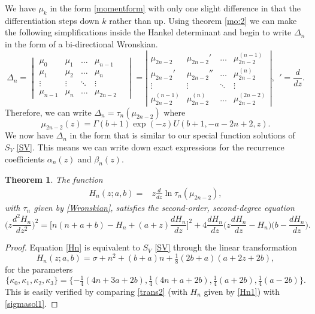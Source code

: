 \documentclass[12pt]{article}
\newtheorem{mydef}{Theorem}[section]
\numberwithin{figure}{section}
\numberwithin{equation}{section}
\numberwithin{table}{section}
\begin{document}
We have $\mu_k$ in the form \eqref{momentform} with only one slight difference in that the differentiation steps down $k$ rather than up. Using theorem \eqref{mo:2} we can make the following simplifications inside the Hankel
determinant and begin to write $\Delta_n$ in the form of a bi-directional Wronskian.
\[\Delta_n=
\begin{vmatrix}
\mu_{0} & \mu_1  &\hdots& \mu_{n-1} \\
\mu_1 & \mu_2  &\hdots& \mu_n  \\
\vdots &\vdots & \ddots &\vdots & \\
\mu_{n-1} & \mu_n &\hdots& \mu_{2n-2}
\end{vmatrix}
=\left|
\begin{array}{ccccc}
\mu_{2n-2} & \mu_{2n-2}' &\hdots& \mu_{2n-2}^{(n-1)} \\
\mu_{2n-2}' & \mu_{2n-2}''  &\hdots& \mu_{2n-2}^{(n)}  \\
\vdots &\vdots & \ddots &\vdots \\
\mu_{2n-2}^{(n-1)} & \mu_{2n-2}^{(n)} &\hdots& \mu_{2n-2}^{(2n-2)}
\end{array}
\right|,~~'=\frac{d}{dz}.\]
Therefore, we can write $\Delta_n=\tau_n(\mu_{2n-2})$
where
\begin{equation}\nonumber
\mu_{2n-2}(z)=\Gamma( b+1)\exp(-z)U( b+1,- a-2n+2,z).
\end{equation}
We now have $\Delta_n$ in the form that is similar to our special function solutions of $S_{V}$ \eqref{SV}. This means we can write down exact expressions for the recurrence coefficients $\alpha_n(z)$ and $\beta_n(z)$.
\begin{mydef} The function
\begin{align}
H_n(z; a, b)=&z\frac{d}{dz}\ln \tau_n(\mu_{2n-2}),\label{Hn1}
\end{align}
with $\tau_n$ given by \eqref{Wronskian}, satisfies the second-order, second-degree equation
\begin{equation}
\bigg(z\frac{d^2H_n}{dz^2}\bigg)^2=\bigg[n(n+ a+ b)-H_n+( a+z)\frac{dH_n}{dz}\bigg]^2+4\frac{dH_n}{dz}\bigg(z
\frac{dH_n}{dz}-H_n\bigg)\bigg( b-\frac{dH_n}{dz}\bigg).\label{Hn}
\end{equation}
\end{mydef}
\begin{proof}
Equation \eqref{Hn} is equivalent to $S_V$ \eqref{SV} through the linear transformation
\begin{equation}
H_{{n}}(z; a, b)  =\sigma + n^2+( b+ a)n+\tfrac{1}{8}(2 b+ a)( a+2z+2 b),\label{trans2}
\end{equation}
for the parameters
\begin{equation}
\{\kappa_0,\kappa_1,\kappa_2,\kappa_3\}=\{-\tfrac{1}{4}(4n+3 a+2 b),\tfrac{1}{4}(4n+ a+2 b),\tfrac{1}{4}( a+2 b)
,\tfrac{1}{4}( a-2 b)\}.\label{parametersl}
\end{equation}
This is easily verified by comparing \eqref{trans2} (with $H_n$ given by \eqref{Hn1}) with \eqref{sigmasol1}.
\end{proof}
\end{document}
